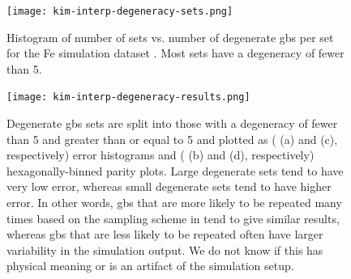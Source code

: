 \documentclass[preprint,12pt]{elsarticle}
\begin{document}
\begin{figure}
    \centering
    \texttt{[image: kim-interp-degeneracy-sets.png]}
    \caption{Histogram of number of sets vs. number of degenerate \glspl{gb} per set for the Fe simulation dataset \cite{kimPhasefieldModeling3D2014}. Most sets have a degeneracy of fewer than 5.}
    \label{fig:kim-interp-degeneracy-sets}
\end{figure}

\begin{figure}
    \centering
    \texttt{[image: kim-interp-degeneracy-results.png]}
    \caption{Degenerate \glspl{gb} sets are split into those with a degeneracy of fewer than 5 and greater than or equal to 5 and plotted as ( (a) and (c), respectively) error histograms and ( (b) and (d), respectively) hexagonally-binned parity plots. Large degenerate sets tend to have very low error, whereas small degenerate sets tend to have higher error. In other words, \glspl{gb} that are more likely to be repeated many times based on the sampling scheme in \cite{kimPhasefieldModeling3D2014} tend to give similar results, whereas \glspl{gb} that are less likely to be repeated often have larger variability in the simulation output. We do not know if this has physical meaning or is an artifact of the simulation setup.}
    \label{fig:kim-interp-degeneracy-results}
\end{figure}


\end{document}
